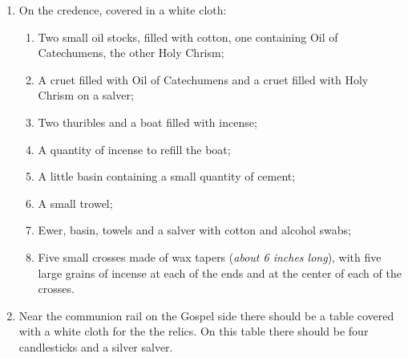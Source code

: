 \documentclass[letterpaper]{report}
\begin{document}
{\begin{enumerate}[label=\Roman*.]
\begin{enumerate}[label=\arabic*.]
                \item A small vessel containing finely sifted ashes;

                \item A cruet of wine on a plate;

                \item A pitcher or ladle for conveying the blessed water from
                    the large vessel to the aspersorium.

            \end{enumerate}

        \item On the credence, covered in a white cloth:

            \begin{enumerate}[label=\arabic*.]

                \item Two small oil stocks, filled with cotton, one containing
                    Oil of Catechumens, the other Holy Chrism;

                \item A cruet filled with Oil of Catechumens and a cruet filled
                    with Holy Chrism on a salver;

                \item Two thuribles and a boat filled with incense;

                \item A quantity of incense to refill the boat;

                \item A little basin containing a small quantity of cement;

                \item A small trowel;

                \item Ewer, basin, towels and a salver with cotton and alcohol
                    swabs;

                \item Five small crosses made of wax tapers (\textit{about 6
                    inches long}), with five large grains of incense at each of 
                    the ends and at the center of each of the crosses.

            \end{enumerate}

        \item Near the communion rail on the Gospel side there should be a
            table covered with a white cloth for the the relics.
            On this table there should be four candlesticks and a silver salver.



\end{enumerate}}
\end{document}
